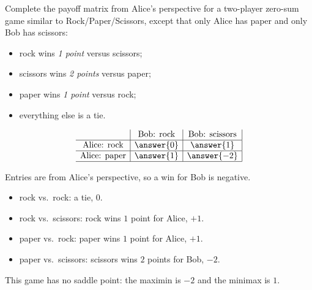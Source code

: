 \documentclass[12pt]{ximera}
\begin{document}
\begin{problem}
Complete the payoff matrix from Alice's perspective for a two-player zero-sum game
similar to Rock/Paper/Scissors, except that only Alice has paper and only Bob has
scissors:
\begin{itemize}
\item rock wins \emph{1 point} versus scissors;
\item scissors wins \emph{2 points} versus paper;
\item paper wins \emph{1 point} versus rock;
\item everything else is a tie.
\end{itemize}

\[
\begin{array}{c|c|c|}
\phantom{|} & \text{Bob: rock} & \text{Bob: scissors} \\\hline
\text{Alice: rock} & \answer{0} & \answer{1} \\\hline
\text{Alice: paper} & \answer{1} & \answer{-2} \\\hline
\end{array}
\]

\begin{hint}
Entries are from Alice's perspective, so a win for Bob is negative.
\end{hint}

\begin{feedback}
\begin{itemize}
\item rock vs.\ rock: a tie, $0$.
\item rock vs.\ scissors: rock wins $1$ point for Alice, $+1$.
\item paper vs.\ rock: paper wins $1$ point for Alice, $+1$.
\item paper vs.\ scissors: scissors wins $2$ points for Bob, $-2$.
\end{itemize}

This game has no saddle point: the maximin is $-2$ and the minimax is $1$.
\end{feedback}
\end{problem}
\end{document}
